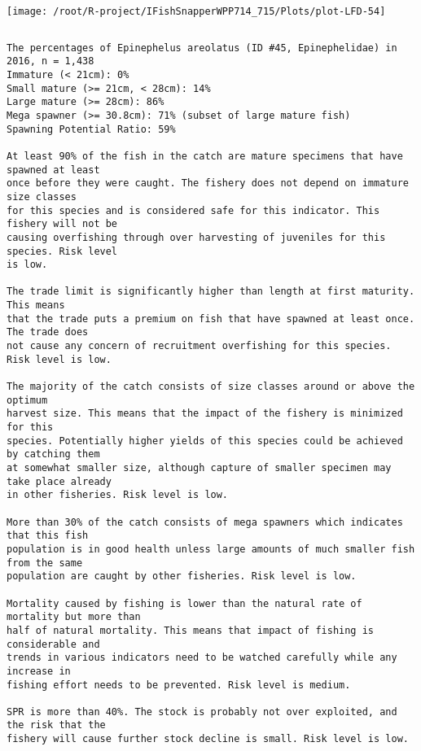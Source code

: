 \documentclass{report}\usepackage[]{graphicx}\usepackage[]{color}
\makeatletter
\def\maxwidth{ %
  \ifdim\Gin@nat@width>\linewidth
    \linewidth
  \else
    \Gin@nat@width
  \fi
}
\newenvironment{kframe}{%
 \def\at@end@of@kframe{}%
 \ifinner\ifhmode%
  \def\at@end@of@kframe{\end{minipage}}%
  \begin{minipage}{\columnwidth}%
 \fi\fi%
 \def\FrameCommand##1{\hskip\@totalleftmargin \hskip-\fboxsep
 \colorbox{shadecolor}{##1}\hskip-\fboxsep
     \hskip-\linewidth \hskip-\@totalleftmargin \hskip\columnwidth}%
 \MakeFramed {\advance\hsize-\width
   \@totalleftmargin\z@ \linewidth\hsize
   \@setminipage}}%
 {\par\unskip\endMakeFramed%
 \at@end@of@kframe}
\newenvironment{knitrout}{}{} %
\makeatother
\begin{document}
\begin{knitrout}
\texttt{[image: /root/R-project/IFishSnapperWPP714\_715/Plots/plot-LFD-54]} 
\begin{kframe}\begin{verbatim}
\end{verbatim}
\end{kframe}
\clearpage
\newpage
\begin{kframe}\begin{verbatim}The percentages of Epinephelus areolatus (ID #45, Epinephelidae) in 2016, n = 1,438
Immature (< 21cm): 0%
Small mature (>= 21cm, < 28cm): 14%
Large mature (>= 28cm): 86%
Mega spawner (>= 30.8cm): 71% (subset of large mature fish)
Spawning Potential Ratio: 59%
 
At least 90% of the fish in the catch are mature specimens that have spawned at least
once before they were caught. The fishery does not depend on immature size classes
for this species and is considered safe for this indicator. This fishery will not be
causing overfishing through over harvesting of juveniles for this species. Risk level
is low.

The trade limit is significantly higher than length at first maturity.  This means
that the trade puts a premium on fish that have spawned at least once. The trade does
not cause any concern of recruitment overfishing for this species. Risk level is low.

The majority of the catch consists of size classes around or above the optimum
harvest size. This means that the impact of the fishery is minimized for this
species. Potentially higher yields of this species could be achieved by catching them
at somewhat smaller size, although capture of smaller specimen may take place already
in other fisheries. Risk level is low.

More than 30% of the catch consists of mega spawners which indicates that this fish
population is in good health unless large amounts of much smaller fish from the same
population are caught by other fisheries. Risk level is low.
 
Mortality caused by fishing is lower than the natural rate of mortality but more than
half of natural mortality. This means that impact of fishing is considerable and
trends in various indicators need to be watched carefully while any increase in
fishing effort needs to be prevented. Risk level is medium.
 
SPR is more than 40%. The stock is probably not over exploited, and the risk that the
fishery will cause further stock decline is small. Risk level is low.
 

\end{verbatim}
\end{kframe}
\end{knitrout}
\end{document}
